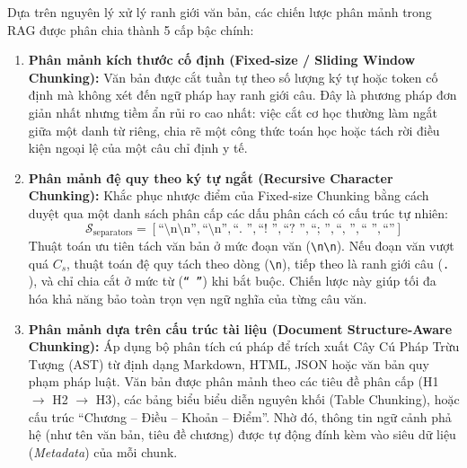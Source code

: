 \documentclass[12pt,a4paper]{report}
\begin{document}
Dựa trên nguyên lý xử lý ranh giới văn bản, các chiến lược phân mảnh trong RAG được phân chia thành 5 cấp bậc chính:

\begin{enumerate}[itemsep=2pt, parsep=0pt, topsep=3pt]
    \item \textbf{Phân mảnh kích thước cố định (Fixed-size / Sliding Window Chunking):}
    Văn bản được cắt tuần tự theo số lượng ký tự hoặc token cố định mà không xét đến ngữ pháp hay ranh giới câu. Đây là phương pháp đơn giản nhất nhưng tiềm ẩn rủi ro cao nhất: việc cắt cơ học thường làm ngắt giữa một danh từ riêng, chia rẽ một công thức toán học hoặc tách rời điều kiện ngoại lệ của một câu chỉ định y tế.

    \item \textbf{Phân mảnh đệ quy theo ký tự ngắt (Recursive Character Chunking):}
    Khắc phục nhược điểm của Fixed-size Chunking bằng cách duyệt qua một danh sách phân cấp các dấu phân cách có cấu trúc tự nhiên:
    \begin{equation}
        \mathcal{S}_{\text{separators}} = [\text{“\textbackslash n\textbackslash n”}, \text{“\textbackslash n”}, \text{“. ”}, \text{“! ”}, \text{“? ”}, \text{“; ”}, \text{“, ”}, \text{“ ”}, \text{“”}]
    \end{equation}
    Thuật toán ưu tiên tách văn bản ở mức đoạn văn (\texttt{\textbackslash n\textbackslash n}). Nếu đoạn văn vượt quá $C_s$, thuật toán đệ quy tách theo dòng (\texttt{\textbackslash n}), tiếp theo là ranh giới câu (\texttt{. }), và chỉ chia cắt ở mức từ (\texttt{“ ”}) khi bắt buộc. Chiến lược này giúp tối đa hóa khả năng bảo toàn trọn vẹn ngữ nghĩa của từng câu văn.

    \item \textbf{Phân mảnh dựa trên cấu trúc tài liệu (Document Structure-Aware Chunking):}
    Áp dụng bộ phân tích cú pháp để trích xuất Cây Cú Pháp Trừu Tượng (AST) từ định dạng Markdown, HTML, JSON hoặc văn bản quy phạm pháp luật. Văn bản được phân mảnh theo các tiêu đề phân cấp (H1 $\rightarrow$ H2 $\rightarrow$ H3), các bảng biểu biểu diễn nguyên khối (Table Chunking), hoặc cấu trúc “Chương -- Điều -- Khoản -- Điểm”. Nhờ đó, thông tin ngữ cảnh phả hệ (như tên văn bản, tiêu đề chương) được tự động đính kèm vào siêu dữ liệu (\textit{Metadata}) của mỗi chunk.


\end{enumerate}
\end{document}
